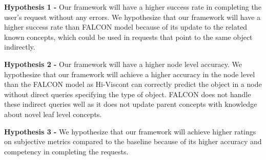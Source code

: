 \noindent\textbf{Hypothesis 1 - } Our framework will have a higher success rate in completing the user's request without any errors. We hypothesize that our framework will have a higher success rate than FALCON model because of its update to the related known concepts, which could be used in requests that point to the same object indirectly.


\noindent\textbf{Hypothesis 2 - } Our framework will have a higher node level accuracy. We hypothesize that our framework will achieve a higher accuracy in the node level than the FALCON model as Hi-Viscont can correctly predict the object in a node without direct queries specifying the type of object. FALCON  does not handle these indirect queries well as it does not update parent concepts with knowledge about novel leaf level concepts.


\noindent\textbf{Hypothesis 3 - } We hypothesize that our framework will achieve higher ratings on subjective metrics compared to the baseline because of its higher accuracy and competency in completing the requests. 
